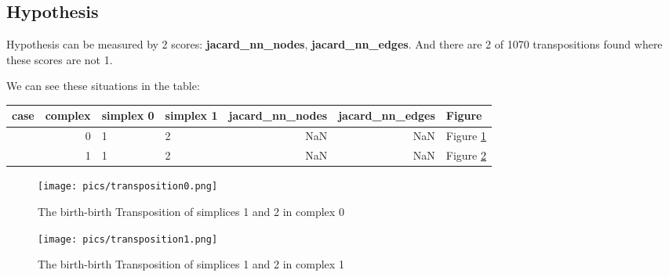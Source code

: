 \documentclass{article}
\begin{document}
\subsection{Hypothesis}
\par Hypothesis can be measured by 2 scores: \textbf{jacard\_nn\_nodes}, \textbf{jacard\_nn\_edges}.
And there are 2 of 1070  transpositions found where these scores are not 1.
\par We can see these situations in the table:
\begin{center}\begin{tabular}{lrllrrl}
\toprule
case & complex & simplex 0 & simplex 1 & jacard\_nn\_nodes & jacard\_nn\_edges & Figure \\
\midrule
& 0 & 1 & 2 & NaN & NaN & Figure \ref{fig:unexpected0} \\
& 1 & 1 & 2 & NaN & NaN & Figure \ref{fig:unexpected1} \\
\bottomrule
\end{tabular}
\end{center}

\begin{figure}[ht]
\centering
\texttt{[image: pics/transposition0.png]}
\caption{The birth-birth Transposition of simplices 1 and 2 in complex 0}
\label{fig:unexpected0}
\end{figure}

\begin{figure}[ht]
\centering
\texttt{[image: pics/transposition1.png]}
\caption{The birth-birth Transposition of simplices 1 and 2 in complex 1}
\label{fig:unexpected1}
\end{figure}
\end{document}
